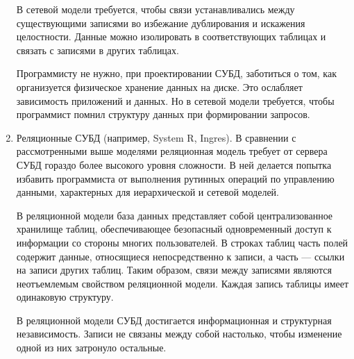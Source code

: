 \documentclass[12pt,a4paper,oneside]{article} %
\begin{document}
\begin{enumerate}
В сетевой модели требуется, чтобы связи устанавливались между \linebreak
существующими записями во избежание дублирования и искажения \linebreak
целостности. Данные можно изолировать в соответствующих таблицах \linebreak
и связать с записями в других таблицах.

Программисту не нужно, при проектировании СУБД, заботиться о том, \linebreak
как организуется физическое хранение данных на диске. Это \linebreak
ослабляет зависимость приложений и данных. Но в сетевой модели \linebreak
требуется, чтобы программист помнил структуру данных при \linebreak
формировании запросов.
\item Реляционные СУБД (например, System R, Ingres). В сравнении \linebreak
с рассмотренными выше моделями реляционная модель требует от \linebreak
сервера СУБД гораздо более высокого уровня сложности. В ней делается \linebreak
попытка избавить программиста от выполнения рутинных операций по \linebreak
управлению данными, характерных для иерархической и сетевой моделей.

В реляционной модели база данных представляет собой \linebreak
централизованное хранилище таблиц, обеспечивающее безопасный \linebreak
одновременный доступ к информации со стороны многих \linebreak
пользователей. В строках таблиц часть полей содержит данные, \linebreak
относящиеся непосредственно к записи, а часть — ссылки на \linebreak
записи других таблиц. Таким образом, связи между записями \linebreak
являются неотъемлемым свойством реляционной модели. Каждая \linebreak
запись таблицы имеет одинаковую структуру.

В реляционной модели СУБД достигается информационная и \linebreak
структурная независимость. Записи не связаны между собой \linebreak
настолько, чтобы изменение одной из них затронуло остальные.


\end{enumerate}
\end{document}
